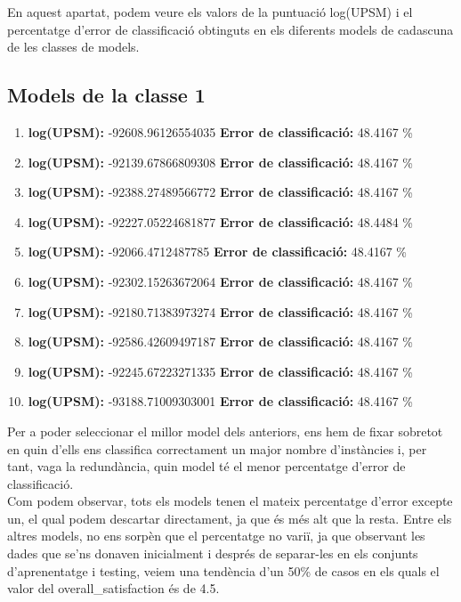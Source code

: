 
	En aquest apartat, podem veure els valors de la puntuació log(UPSM) i el percentatge d'error de classificació obtinguts en els diferents models de cadascuna de les classes de models. 
	\subsection{Models de la classe 1}
	\begin{enumerate}
		\item \textbf{log(UPSM):} -92608.96126554035 \textbf{Error de classificació:} 48.4167 \%
		\item \textbf{log(UPSM):} -92139.67866809308 \textbf{Error de classificació:} 48.4167 \%
		\item \textbf{log(UPSM):} -92388.27489566772 \textbf{Error de classificació:} 48.4167 \%
		\item \textbf{log(UPSM):} -92227.05224681877 \textbf{Error de classificació:} 48.4484 \%
		\item \textbf{log(UPSM):} -92066.4712487785 \textbf{Error de classificació:} 48.4167 \%
		\item \textbf{log(UPSM):} -92302.15263672064 \textbf{Error de classificació:} 48.4167 \%
		\item \textbf{log(UPSM):} -92180.71383973274 \textbf{Error de classificació:} 48.4167 \%
		\item \textbf{log(UPSM):} -92586.42609497187 \textbf{Error de classificació:} 48.4167 \%
		\item \textbf{log(UPSM):} -92245.67223271335 \textbf{Error de classificació:} 48.4167 \%
		\item \textbf{log(UPSM):} -93188.71009303001 \textbf{Error de classificació:} 48.4167 \%
	\end{enumerate}
	\vspace{0.5cm}
	Per a poder seleccionar el millor model dels anteriors, ens hem de fixar sobretot en quin d'ells ens classifica correctament un major nombre d'instàncies i, per tant, vaga la redundància, quin model té el menor percentatge d'error de classificació.\\
	Com podem observar, tots els models tenen el mateix percentatge d'error excepte un, el qual podem descartar directament, ja que és més alt que la resta. Entre els altres models, no ens sorpèn que el percentatge no variï, ja que observant les dades que se'ns donaven inicialment i després de separar-les en els conjunts d'aprenentatge i testing, veiem una tendència d'un 50\% de casos en els quals el valor del overall\_satisfaction és de 4.5.\\\\
